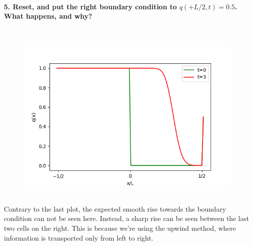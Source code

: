 \paragraph{5. Reset, and put the right boundary condition 
    to $q(+L/2,t)=0.5$. What happens, and why?
} \ \\ 
    \begin{figure}[h!]
        \centering
        \includegraphics[width=.6\textwidth]{../figures/upwind_5.png}
    \end{figure} \ \\ 
    Contrary to the last plot, the expected smooth 
    rise towards the boundary condition can not 
    be seen here. Instead, a sharp rise can be 
    seen between the last two cells on the right.
    This is because we're using the upwind method, 
    where information is transported only from left
    to right.

